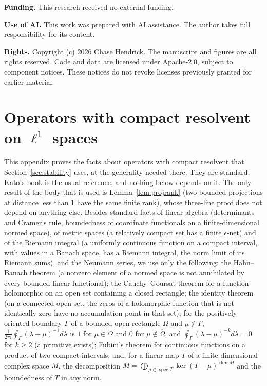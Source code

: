 \documentclass[11pt]{article}
\theoremstyle{definition}
\newcommand{\spec}{\operatorname{spec}}
\begin{document}
\noindent\textbf{Funding.} This research received no external funding.

\noindent\textbf{Use of AI.} This work was prepared with AI assistance. The author takes full responsibility for its content.

{\raggedright\noindent\textbf{Rights.} Copyright (c) 2026 Chase Hendrick. The manuscript and figures are all rights reserved. Code and data are licensed under Apache-2.0, subject to component notices. These notices do not revoke licenses previously granted for earlier material.\par}

\appendix

\section{Operators with compact resolvent on \texorpdfstring{$\ell^1$}{l1} spaces}\label{app:resolvent}

This appendix proves the facts about operators with compact resolvent that Section~\ref{sec:stability} uses, at the generality needed there. They are standard; Kato's book \cite[Ch.~III, Sect.~6]{kato1976} is the usual reference, and nothing below depends on it. The only result of the body that is used is Lemma~\ref{lem:projrank} (two bounded projections at distance less than $1$ have the same finite rank), whose three-line proof does not depend on anything else. Besides standard facts of linear algebra (determinants and Cramer's rule, boundedness of coordinate functionals on a finite-dimensional normed space), of metric spaces (a relatively compact set has a finite $\epsilon$-net) and of the Riemann integral (a uniformly continuous function on a compact interval, with values in a Banach space, has a Riemann integral, the norm limit of its Riemann sums), and the Neumann series, we use only the following: the Hahn--Banach theorem (a nonzero element of a normed space is not annihilated by every bounded linear functional); the Cauchy--Goursat theorem for a function holomorphic on an open set containing a closed rectangle; the identity theorem (on a connected open set, the zeros of a holomorphic function that is not identically zero have no accumulation point in that set); for the positively oriented boundary $\Gamma$ of a bounded open rectangle $\Omega$ and $\mu \notin \Gamma$, $\frac{1}{2\pi i}\oint_\Gamma(\lambda - \mu)^{-1}d\lambda$ is $1$ for $\mu \in \Omega$ and $0$ for $\mu \notin \overline\Omega$, and $\oint_\Gamma(\lambda - \mu)^{-k}d\lambda = 0$ for $k \ge 2$ (a primitive exists); Fubini's theorem for continuous functions on a product of two compact intervals; and, for a linear map $T$ of a finite-dimensional complex space $M$, the decomposition $M = \bigoplus_{\mu\in\spec T}\ker(T - \mu)^{\dim M}$ and the boundedness of $T$ in any norm.
\end{document}
